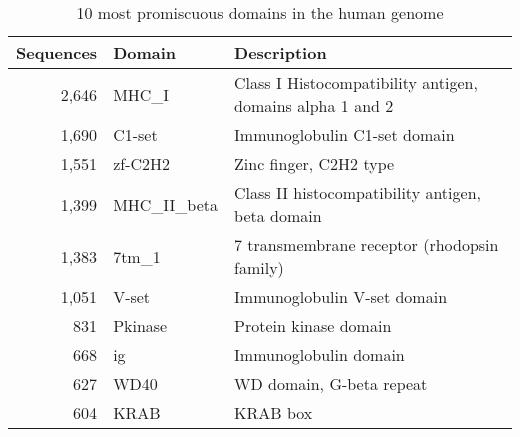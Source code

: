 \begin{table}
	\begin{center}
		\sf
		\begin{tabular}{r l l}
			\textbf{Sequences} & \textbf{Domain} & \textbf{Description} \\
			\hline
			2,646 & MHC\_I       & Class I Histocompatibility antigen, domains alpha 1 and 2	\\	 			
			1,690 & C1-set      & Immunoglobulin C1-set domain                              			\\ 
			1,551 & zf-C2H2     & Zinc finger, C2H2 type                                    			\\ 
			1,399 & MHC\_II\_beta & Class II histocompatibility antigen, beta domain          			\\ 
			1,383 & 7tm\_1       & 7 transmembrane receptor (rhodopsin family)               			\\ 
			1,051 & V-set       & Immunoglobulin V-set domain                               			\\ 
			831  & Pkinase     & Protein kinase domain                                     			\\ 
			668  & ig          & Immunoglobulin domain                                     			\\ 
			627  & WD40        & WD domain, G-beta repeat                                  			\\ 
			604  & KRAB        & KRAB box			\\ 
			\hline
		\end{tabular}
		\caption{10 most promiscuous domains in the human genome}
	\end{center}
\end{table}

